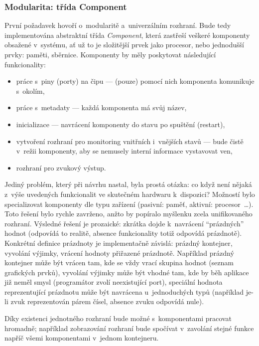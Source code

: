 \subsubsection{Modularita: třída Component}
První požadavek hovoří o~modularitě a~univerzálním rozhraní. Bude tedy implementována abstraktní třída \emph{Component}, která zastřeší veškeré komponenty obsažené v~systému, ať už to je složitější prvek jako procesor, nebo jednodušší prvky: paměti, sběrnice. Komponenty by měly poskytovat následující funkcionality:
\begin{itemize}
	\item práce s~piny (porty) na čipu --- (pouze) pomocí nich komponenta komunikuje s~okolím,
	\item práce s~metadaty --- každá komponenta má svůj název,
	\item inicializace --- navrácení komponenty do stavu po spuštění (restart),
	\item vytvoření rozhraní pro monitoring vnitřních i~vnějších stavů --- bude čistě v~režii komponenty, aby se nemusely interní informace vystavovat ven,
	\item rozhraní pro zvukový výstup.
\end{itemize}

Jediný problém, který při návrhu nastal, byla prostá otázka: co když není nějaká z~výše uvedených funkcionalit ve skutečném hardwaru k~dispozici? Možností bylo specializovat komponenty dle typu zařízení (pasivní: paměť, aktivní: procesor~\dots). Toto řešení bylo rychle zavrženo, anžto by popíralo myšlenku zcela unifikovaného rozhraní. Výsledné řešení je prozaické: zkrátka dojde k~navrácení \enquote{prázdných} hodnot (odpovídá to realitě, absence funkcionality totiž odpovídá prázdnotě). Konkrétní definice prázdnoty je implementačně závislá: prázdný kontejner, vyvolání výjimky, vrácení hodnoty přiřazené prázdnotě. Například prázdný kontejner může být vrácen tam, kde se vždy vrací skupina hodnot (seznam grafických prvků), vyvolání výjimky může být vhodné tam, kde by běh aplikace již neměl smysl (programátor zvolí neexistující port), speciální hodnota reprezentující prázdnotu může být navrácena u~jednoduchých typů (například je-li zvuk reprezentován párem čísel, absence zvuku odpovídá nule).

Díky existenci jednotného rozhraní bude možné s~komponentami pracovat hromadně; například zobrazování rozhraní bude spočívat v~zavolání stejné funkce napříč všemi komponentami v~jednom kontejneru.

